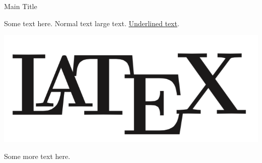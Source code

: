 \documentclass{article}
\begin{document}
\begin{center}
    Main Title
\end{center}

Some text here. Normal text {\large large text}.
\underline{Underlined text}.


\begin{center}
    \includegraphics[width=0.3\linewidth]{Logo.png}
\end{center}

\noindent Some more text here.
\end{document}
